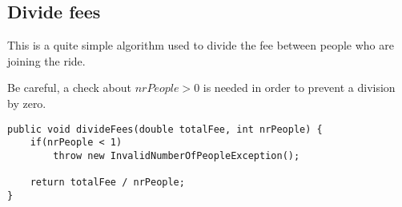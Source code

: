 \subsection{Divide fees}
This is a quite simple algorithm used to divide the fee between 
people who are joining the ride.

Be careful, a check about $ nrPeople > 0 $ is needed in order to prevent
a division by zero.

\begin{lstlisting}[caption={Divide fees between partecipants}]
public void divideFees(double totalFee, int nrPeople) {
    if(nrPeople < 1)
        throw new InvalidNumberOfPeopleException();

    return totalFee / nrPeople;
}
\end{lstlisting}
